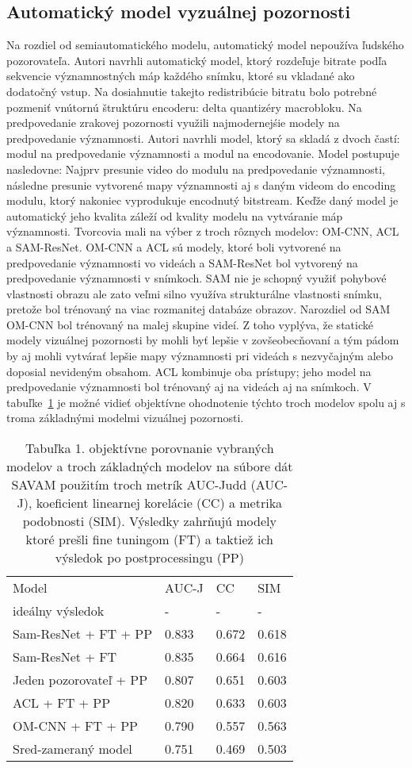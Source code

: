 \documentclass[10pt,twoside,slovak,a4paper]{article}
\begin{document}
\subsection{Automatický model vyzuálnej pozornosti} \label{auto}
Na rozdiel od semiautomatického modelu, automatický model nepoužíva ľudského pozorovateľa. Autori\cite{Czarnecki:Progress} navrhli automatický model, ktorý rozdeľuje bitrate podľa sekvencie významnostných máp každého snímku, ktoré su vkladané ako dodatočný vstup. Na dosiahnutie takejto redistribúcie bitratu bolo potrebné pozmeniť vnútornú štruktúru encoderu: delta quantizéry macrobloku. Na predpovedanie zrakovej pozornosti využili najmodernejśie modely na predpovedanie významnosti. Autori\cite{Czarnecki:Progress} navrhli model, ktorý sa skladá z dvoch častí: modul na predpovedanie významnosti a modul na encodovanie. Model postupuje nasledovne: Najprv presunie video do modulu na predpovedanie významnosti, následne presunie vytvorené mapy významnosti aj s daným videom do encoding modulu, ktorý nakoniec vyprodukuje encodnutý bitstream. Keďže daný model je automatický jeho kvalita záleží od kvality modelu na vytváranie máp významnosti. Tvorcovia mali na výber z troch rôznych modelov: OM-CNN, ACL a SAM-ResNet. OM-CNN a ACL sú modely, ktoré boli vytvorené na predpovedanie významnosti vo videách a SAM-ResNet bol vytvorený na predpovedanie významnosti v snímkoch. SAM nie je schopný využiť pohybové vlastnosti obrazu ale zato veľmi silno využíva strukturálne vlastnosti snímku, pretože bol trénovaný na viac rozmanitej databáze obrazov. Narozdiel od SAM OM-CNN bol trénovaný na malej skupine videí. Z toho vyplýva, že statické modely vizuálnej pozornosti by mohli byť lepšie v zovšeobecňovaní a tým pádom by aj mohli vytvárať lepšie mapy významnosti pri videách s nezvyčajným alebo doposial nevideným obsahom. ACL kombinuje oba prístupy; jeho model na predpovedanie významnosti bol trénovaný aj na videách aj na snímkoch. V tabuľke~\ref{tab:mapy} je možné vidieť objektívne ohodnotenie týchto troch modelov spolu aj s troma základnými modelmi vizuálnej pozornosti.
\begin{table}[]
\caption{Tabuľka 1. objektívne porovnanie vybraných modelov a troch základných modelov na súbore dát SAVAM použitím troch metrík AUC-Judd (AUC-J), koeficient linearnej korelácie (CC) a metrika podobnosti (SIM). Výsledky zahrňujú modely ktoré prešli fine tuningom (FT) a taktiež ich výsledok po postprocessingu (PP)}
\label{tab:mapy}
\begin{tabular}{llll}
Model                  & AUC-J & CC    & SIM   \\
ideálny výsledok       & -     & -     & -     \\
Sam-ResNet + FT + PP   & 0.833 & 0.672 & 0.618 \\
Sam-ResNet + FT        & 0.835 & 0.664 & 0.616 \\
Jeden pozorovateľ + PP & 0.807 & 0.651 & 0.603 \\
ACL + FT + PP          & 0.820 & 0.633 & 0.603 \\
OM-CNN + FT + PP       & 0.790 & 0.557 & 0.563 \\
Sred-zameraný model    & 0.751 & 0.469 & 0.503
\end{tabular}
\end{table}
\end{document}
